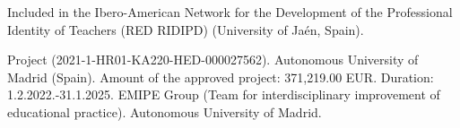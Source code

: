 \documentclass[english]{textolivre}
\begin{document}
Included in the Ibero-American Network for the Development of the Professional Identity of Teachers (RED RIDIPD) (University of Jaén, Spain).

Project (2021-1-HR01-KA220-HED-000027562). Autonomous University of Madrid (Spain). Amount of the approved project: 371,219.00 EUR. Duration: 1.2.2022.-31.1.2025. EMIPE Group (Team for interdisciplinary improvement of educational practice). Autonomous University of Madrid.

\printbibliography\label{sec-bib}
\end{document}
